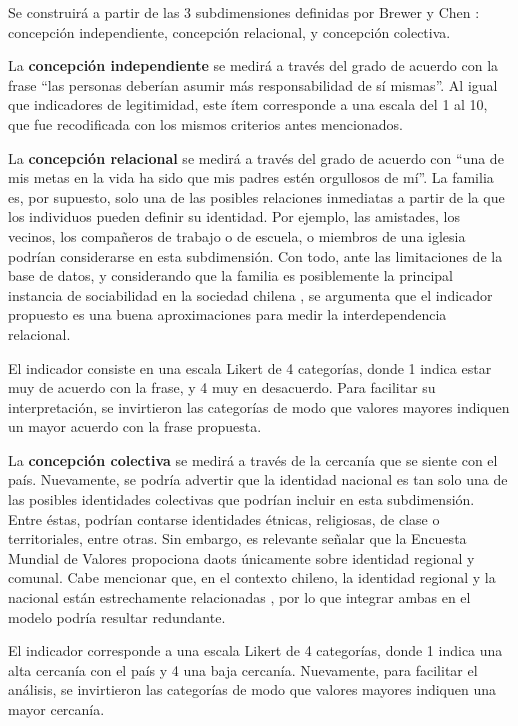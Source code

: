 \documentclass[12pt,twoside]{templates/facsothesis}
\begin{document}
Se construirá a partir de las 3 subdimensiones definidas por Brewer y Chen \citeyearpar{brewer2007}: concepción independiente, concepción relacional, y concepción colectiva.

La \textbf{concepción independiente} se medirá a través del grado de acuerdo con la frase ``las personas deberían asumir más responsabilidad de sí mismas''. Al igual que indicadores de legitimidad, este ítem corresponde a una escala del 1 al 10, que fue recodificada con los mismos criterios antes mencionados.

La \textbf{concepción relacional} se medirá a través del grado de acuerdo con ``una de mis metas en la vida ha sido que mis padres estén orgullosos de mí''. La familia es, por supuesto, solo una de las posibles relaciones inmediatas a partir de la que los individuos pueden definir su identidad. Por ejemplo, las amistades, los vecinos, los compañeros de trabajo o de escuela, o miembros de una iglesia podrían considerarse en esta subdimensión. Con todo, ante las limitaciones de la base de datos, y considerando que la familia es posiblemente la principal instancia de sociabilidad en la sociedad chilena \citep{araujo2012}, se argumenta que el indicador propuesto es una buena aproximaciones para medir la interdependencia relacional.

El indicador consiste en una escala Likert de 4 categorías, donde 1 indica estar muy de acuerdo con la frase, y 4 muy en desacuerdo. Para facilitar su interpretación, se invirtieron las categorías de modo que valores mayores indiquen un mayor acuerdo con la frase propuesta.

La \textbf{concepción colectiva} se medirá a través de la cercanía que se siente con el país. Nuevamente, se podría advertir que la identidad nacional es tan solo una de las posibles identidades colectivas que podrían incluir en esta subdimensión. Entre éstas, podrían contarse identidades étnicas, religiosas, de clase o territoriales, entre otras. Sin embargo, es relevante señalar que la Encuesta Mundial de Valores propociona daots únicamente sobre identidad regional y comunal. Cabe mencionar que, en el contexto chileno, la identidad regional y la nacional están estrechamente relacionadas \citep{zuniga2010}, por lo que integrar ambas en el modelo podría resultar redundante.

El indicador corresponde a una escala Likert de 4 categorías, donde 1 indica una alta cercanía con el país y 4 una baja cercanía. Nuevamente, para facilitar el análisis, se invirtieron las categorías de modo que valores mayores indiquen una mayor cercanía.
\end{document}
